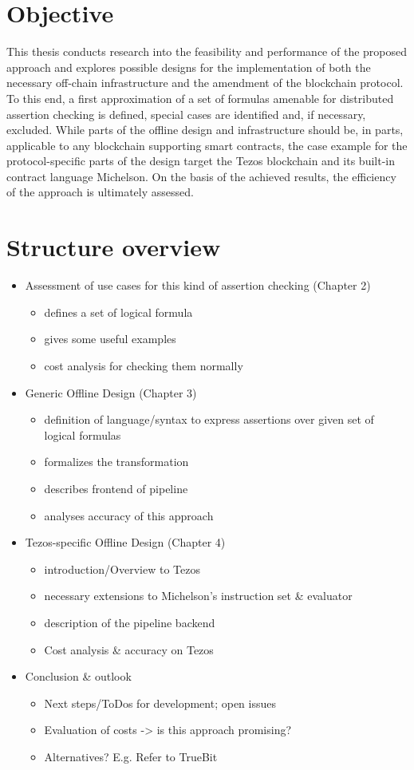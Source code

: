 \section{Objective}
This thesis conducts research into the feasibility and performance of the proposed approach and explores possible designs for the implementation of both the necessary off-chain infrastructure and the amendment of the blockchain protocol. To this end, a first approximation of a set of formulas amenable for distributed assertion checking is defined, special cases are identified and, if necessary, excluded. While parts of the offline design and infrastructure should be, in parts, applicable to any blockchain supporting smart contracts, the case example for the protocol-specific parts of the design target the Tezos blockchain and its built-in contract language Michelson. On the basis of the achieved results, the efficiency of the approach is ultimately assessed.

\section{Structure overview}
\begin{itemize}
\item Assessment of use cases for this kind of assertion checking (Chapter 2)
	\begin{itemize}
	\item defines a set of logical formula
	\item gives some useful examples
	\item cost analysis for checking them normally
	\end{itemize}
\item Generic Offline Design (Chapter 3)
	\begin{itemize}
	\item definition of language/syntax to express assertions over given set of logical formulas
	\item formalizes the transformation
	\item describes frontend of pipeline
	\item analyses accuracy of this approach
	\end{itemize}
\item Tezos-specific Offline Design (Chapter 4)
	\begin{itemize}
	\item introduction/Overview to Tezos
	\item necessary extensions to Michelson's instruction set \& evaluator
	\item description of the pipeline backend
	\item Cost analysis \& accuracy on Tezos
	\end{itemize}
\item Conclusion \& outlook
	\begin{itemize}
	\item Next steps/ToDos for development; open issues
	\item Evaluation of costs -> is this approach promising?
	\item Alternatives? E.g. Refer to TrueBit
	\end{itemize}
\end{itemize}
